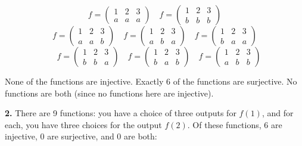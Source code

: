 \documentclass[10pt,]{book}
\theoremstyle{plain}
\theoremstyle{definition}
\theoremstyle{definition}
\theoremstyle{definition}
\numberwithin{equation}{chapter}
\newcommand{\amp}{ & }
\begin{document}
              \begin{equation*} f = \begin{pmatrix} 1 \amp 2 \amp 3 \\ a \amp a\amp a \end{pmatrix} \quad f = \begin{pmatrix} 1 \amp 2 \amp 3 \\ b \amp b \amp b \end{pmatrix}\end{equation*}
              \begin{equation*} f = \begin{pmatrix} 1 \amp 2 \amp 3 \\ a \amp a\amp b \end{pmatrix} \quad f = \begin{pmatrix} 1 \amp 2 \amp 3 \\ a \amp b \amp a \end{pmatrix} \quad f = \begin{pmatrix} 1 \amp 2 \amp 3 \\ b \amp a\amp a \end{pmatrix}
              \end{equation*}
              \begin{equation*}
                \quad f = \begin{pmatrix} 1 \amp 2 \amp 3 \\ b \amp b \amp a \end{pmatrix} \quad f = \begin{pmatrix} 1 \amp 2 \amp 3 \\ b \amp a\amp b \end{pmatrix} \quad f = \begin{pmatrix} 1 \amp 2 \amp 3 \\ a \amp b \amp b \end{pmatrix} \end{equation*}



            None of the functions are injective. Exactly 6 of the functions are surjective. No functions are both (since no functions here are injective).
\par\smallskip
\noindent\textbf{2.}\quad{}
            There are 9 functions: you have a choice of three outputs for \(f(1)\), and for each, you have three choices for the output \(f(2)\). Of these functions, 6 are injective, 0 are surjective, and 0 are both:
\end{document}
